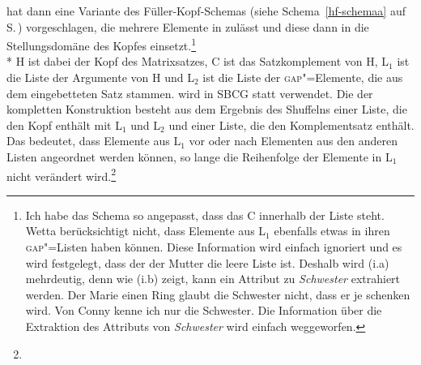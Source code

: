 \begin{exe}
\begin{xlist}
\noindent
\citet{Wetta2018a} hat dann eine Variante des Füller-Kopf-Schemas (siehe Schema~\ref{hf-schemaa} auf
S.\,\pageref{hf-schemaa})
vorgeschlagen, die mehrere Elemente in \slasch zulässt und diese dann in die Stellungsdomäne des
Kopfes einsetzt.\footnote{%
  Ich habe das Schema so angepasst, dass das C innerhalb der Liste steht. Wetta berücksichtigt
  nicht, dass Elemente aus L$_1$ ebenfalls etwas in ihren \textsc{gap}"=Listen haben können. Diese
  Information wird einfach ignoriert und es wird festgelegt, dass der \gapw der Mutter die leere
  Liste ist. Deshalb wird (i.a) mehrdeutig, denn wie (i.b) zeigt, kann ein Attribut zu \emph{Schwester}
  extrahiert werden.
\eal
\ex Der Marie einen Ring glaubt die Schwester nicht, dass er je schenken wird.
\ex Von Conny kenne ich nur die Schwester.
\zl
Die Information über die Extraktion des Attributs von \emph{Schwester} wird einfach weggeworfen.
}
\ea
\label{schema-f-g-wetta}
 \impl\\*
\z
H ist dabei der Kopf des Matrixsatzes, C ist das Satzkomplement von H, L$_1$ ist die Liste der
Argumente von H und L$_2$ ist die Liste der \textsc{gap}"=Elemente, die aus dem eingebetteten Satz
stammen. \gap wird in SBCG statt \slasch verwendet. Die \dtrsl der kompletten Konstruktion besteht aus dem Ergebnis des Shuffelns einer Liste,
die den Kopf enthält mit L$_1$ und L$_2$ und einer Liste, die den Komplementsatz enthält. Das
bedeutet, dass Elemente aus L$_1$ vor oder nach Elementen aus den anderen Listen angeordnet werden
können, so lange die Reihenfolge der Elemente in L$_1$ nicht verändert wird.\footnote{%
}
\end{xlist}
\end{exe}
